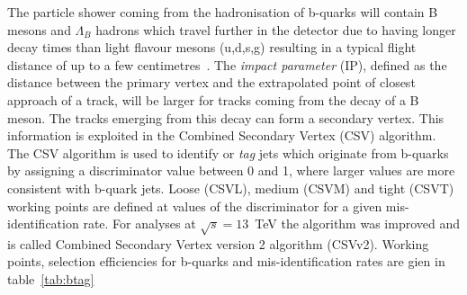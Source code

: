 The particle shower coming from the hadronisation of b-quarks will contain B mesons and $\Lambda_{B}$ hadrons which travel further in the detector due to having longer decay times than light flavour mesons (u,d,s,g) resulting in a typical flight distance of up to a few centimetres~\cite{Collaboration2015BS0}. The \emph{impact parameter} (IP), defined as the distance between the primary vertex and the extrapolated point of closest approach of a track, will be larger for tracks coming from the decay of a B meson. The tracks emerging from this decay can form a secondary vertex. This information is exploited in the Combined Secondary Vertex (CSV) algorithm. The CSV algorithm is used to identify or \emph{tag} jets which originate from b-quarks by assigning a discriminator value between 0 and 1, where larger values are more consistent with b-quark jets. Loose (CSVL), medium (CSVM) and tight (CSVT) working points are defined at values of the discriminator for a given mis-identification rate. For analyses at $\sqrt{s} = 13$~TeV the algorithm was improved and is called Combined Secondary Vertex version 2 algorithm (CSVv2). Working points, selection efficiencies for b-quarks and mis-identification rates are gien in table~\ref{tab:btag} 


